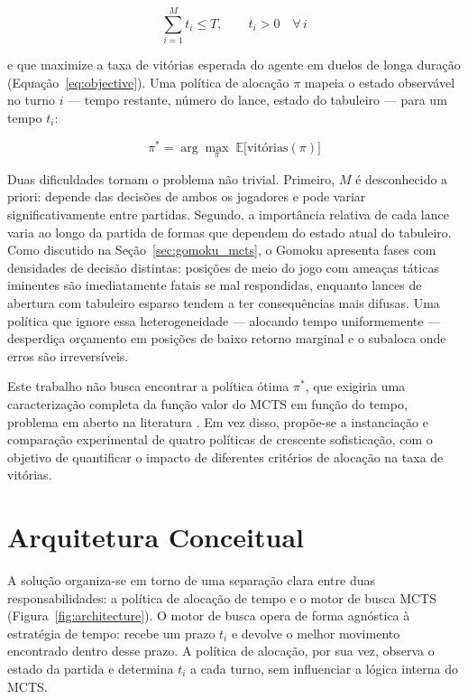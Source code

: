 \documentclass[cic,tc]{iiufrgs}
\begin{document}
\begin{equation}
    \sum_{i=1}^{M} t_i \leq T, \qquad t_i > 0 \quad \forall\, i
\label{eq:budget_constraint}
\end{equation}

e que maximize a taxa de vitórias esperada do agente em duelos de longa duração (Equação~\ref{eq:objective}). Uma política de alocação $\pi$ mapeia o estado observável no turno $i$ — tempo restante, número do lance, estado do tabuleiro — para um tempo $t_i$:

\begin{equation}
    \pi^* = \arg\max_{\pi} \; \mathbb{E}\bigl[\text{vitórias}(\pi)\bigr]
\label{eq:objective}
\end{equation}

Duas dificuldades tornam o problema não trivial. Primeiro, $M$ é desconhecido a priori: depende das decisões de ambos os jogadores e pode variar significativamente entre partidas. Segundo, a importância relativa de cada lance varia ao longo da partida de formas que dependem do estado atual do tabuleiro. Como discutido na Seção~\ref{sec:gomoku_mcts}, o Gomoku apresenta fases com densidades de decisão distintas: posições de meio do jogo com ameaças táticas iminentes são imediatamente fatais se mal respondidas, enquanto lances de abertura com tabuleiro esparso tendem a ter consequências mais difusas. Uma política que ignore essa heterogeneidade — alocando tempo uniformemente — desperdiça orçamento em posições de baixo retorno marginal e o subaloca onde erros são irreversíveis.

Este trabalho não busca encontrar a política ótima $\pi^*$, que exigiria uma caracterização completa da função valor do MCTS em função do tempo, problema em aberto na literatura \cite{browne2012survey}. Em vez disso, propõe-se a instanciação e comparação experimental de quatro políticas de crescente sofisticação, com o objetivo de quantificar o impacto de diferentes critérios de alocação na taxa de vitórias.

\section{Arquitetura Conceitual}
\label{sec:architecture}

A solução organiza-se em torno de uma separação clara entre duas responsabilidades: a política de alocação de tempo e o motor de busca MCTS (Figura~\ref{fig:architecture}). O motor de busca opera de forma agnóstica à estratégia de tempo: recebe um prazo $t_i$ e devolve o melhor movimento encontrado dentro desse prazo. A política de alocação, por sua vez, observa o estado da partida e determina $t_i$ a cada turno, sem influenciar a lógica interna do MCTS.
\end{document}
